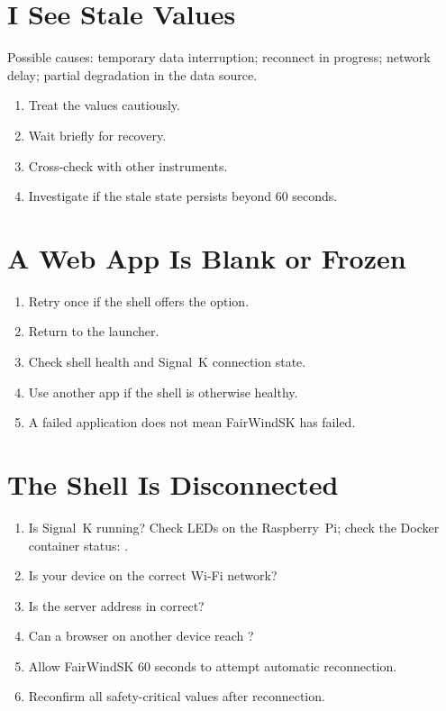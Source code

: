 \section{I See Stale Values}

Possible causes: temporary data interruption; reconnect in progress; network delay;
partial degradation in the data source.

\begin{enumerate}
  \item Treat the values cautiously.
  \item Wait briefly for recovery.
  \item Cross-check with other instruments.
  \item Investigate if the stale state persists beyond 60 seconds.
\end{enumerate}

\section{A Web App Is Blank or Frozen}

\begin{enumerate}
  \item Retry once if the shell offers the option.
  \item Return to the launcher.
  \item Check shell health and Signal~K connection state.
  \item Use another app if the shell is otherwise healthy.
  \item A failed application does not mean FairWindSK has failed.
\end{enumerate}

\section{The Shell Is Disconnected}

\begin{enumerate}
  \item Is Signal~K running? Check LEDs on the Raspberry~Pi; check the Docker
        container status: .
  \item Is your device on the correct Wi-Fi network?
  \item Is the server address in  correct?
  \item Can a browser on another device reach ?
  \item Allow FairWindSK 60 seconds to attempt automatic reconnection.
  \item Reconfirm all safety-critical values after reconnection.
\end{enumerate}


